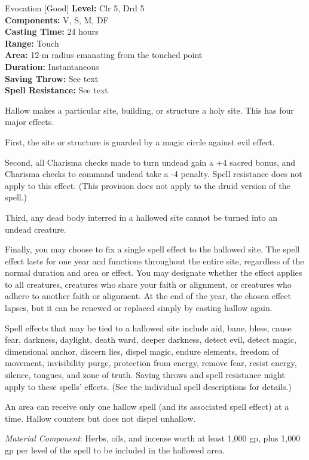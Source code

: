 {Evocation [Good]}
{
	\textbf{Level:}
	Clr 5, Drd 5\\
	\textbf{Components:}
	V, S, M, DF\\
	\textbf{Casting Time:}
	24 hours\\
	\textbf{Range:}
	Touch\\
	\textbf{Area:}
	12-m radius emanating from the touched point\\
	\textbf{Duration:}
	Instantaneous\\
	\textbf{Saving Throw:}
	See text\\
	\textbf{Spell Resistance:}
	See text\\
}
{
	Hallow makes a particular site, building, or structure a holy site. This has four major effects.

	First, the site or structure is guarded by a magic circle against evil effect.

	Second, all Charisma checks made to turn undead gain a +4 sacred bonus, and Charisma checks to command undead take a -4 penalty. Spell resistance does not apply to this effect. (This provision does not apply to the druid version of the spell.)

	Third, any dead body interred in a hallowed site cannot be turned into an undead creature.

	Finally, you may choose to fix a single spell effect to the hallowed site. The spell effect lasts for one year and functions throughout the entire site, regardless of the normal duration and area or effect. You may designate whether the effect applies to all creatures, creatures who share your faith or alignment, or creatures who adhere to another faith or alignment. At the end of the year, the chosen effect lapses, but it can be renewed or replaced simply by casting hallow again.

	Spell effects that may be tied to a hallowed site include aid, bane, bless, cause fear, darkness, daylight, death ward, deeper darkness, detect evil, detect magic, dimensional anchor, discern lies, dispel magic, endure elements, freedom of movement, invisibility purge, protection from energy, remove fear, resist energy, silence, tongues, and zone of truth. Saving throws and spell resistance might apply to these spells' effects. (See the individual spell descriptions for details.)

	An area can receive only one hallow spell (and its associated spell effect) at a time. Hallow counters but does not dispel unhallow.

	\textit{Material Component}:
	Herbs, oils, and incense worth at least 1,000 gp, plus 1,000 gp per level of the spell to be included in the hallowed area.

}
